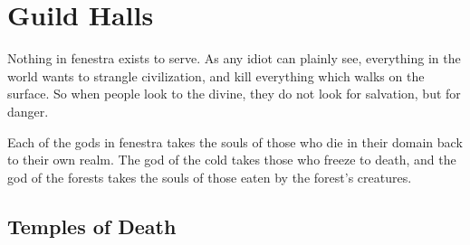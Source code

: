 \chapter{Guild Halls}

Nothing in \gls{fenestra} exists to serve.
As any idiot can plainly see, everything in the world wants to strangle civilization, and kill everything which walks on the surface.
So when people look to the divine, they do not look for salvation, but for danger.

Each of the gods in \gls{fenestra} takes the souls of those who die in their domain back to their own realm.
The god of the cold takes those who freeze to death, and the god of the forests takes the souls of those eaten by the forest's creatures.

\section{Temples of Death}

